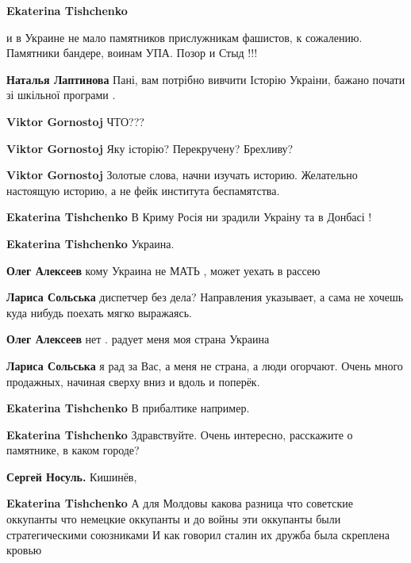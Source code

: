 \begin{itemize}
\begin{itemize}
\textbf{Ekaterina Tishchenko} 

и в Украине не мало памятников прислужникам фашистов, к сожалению. Памятники
бандере, воинам УПА. Позор и Стыд !!!

\begin{itemize} %
\textbf{Наталья Лаптинова} Пані, вам потрібно вивчити Історію Украіни, бажано почати зі шкільної програми .

\textbf{Viktor Gornostoj} ЧТО???

\textbf{Viktor Gornostoj} Яку історію? Перекручену? Брехливу?

\textbf{Viktor Gornostoj} Золотые слова, начни изучать историю. Желательно настоящую историю, а не фейк института беспамятства.
\end{itemize} %

\textbf{Ekaterina Tishchenko} В Криму Росія ни зрадили Украіну та в Донбасі !

\textbf{Ekaterina Tishchenko} Украина.

\begin{itemize} %
\textbf{Олег Алексеев} кому Украина не МАТЬ , может уехать в рассею

\textbf{Лариса Сольська} диспетчер без дела? Направления указывает, а сама не хочешь куда нибудь поехать мягко выражаясь.

\textbf{Олег Алексеев} нет . радует меня моя страна Украина

\textbf{Лариса Сольська} я рад за Вас, а меня не страна, а люди огорчают. Очень много продажных, начиная сверху вниз и вдоль и поперёк.
\end{itemize} %

\textbf{Ekaterina Tishchenko} В прибалтике например.

\textbf{Ekaterina Tishchenko} Здравствуйте. Очень интересно, расскажите о памятнике, в каком городе?

\textbf{Сергей Носуль.} Кишинёв,

\textbf{Ekaterina Tishchenko} А для Молдовы какова разница что советские оккупанты что немецкие оккупанты и до войны эти оккупанты были стратегическими союзниками И как говорил сталин их дружба была скреплена кровью


\end{itemize}
\end{itemize}
